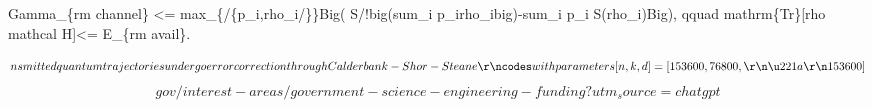 
\begin{tzpsnapshot}
\end{tzpsnapshot}

Gamma\_\{rm channel\} <= max\_\{/\{p\_i,rho\_i/\}\}Big( S/!big(sum\_i p\_irho\_ibig)-sum\_i p\_i S(rho\_i)Big), qquad mathrm\{Tr\}[rho mathcal H]<= E\_\{rm avail\}.

\[
nsmitted quantum trajectories undergo error correction through Calderbank-Shor-Steane\r\ncodes with parameters [n, k, d] = [153600, 76800,\r\n\u221a\r\n153600]
\]
\[
gov/interest-areas/government-science-engineering-funding?utm_source=chatgpt
\]

